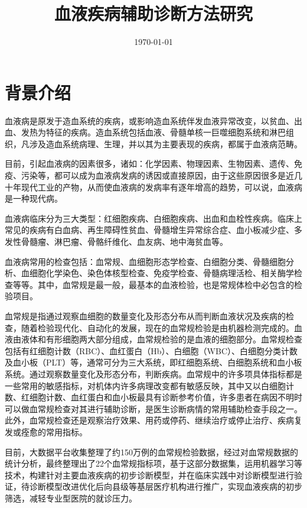 \documentclass[UTF8,a4paper,12pt, onecolumn]{ctexart}
\title{血液疾病辅助诊断方法研究}
\author{}
\date{\today}
\begin{document}
    \maketitle
    \thispagestyle{fancy}
    
\tableofcontents

\section{背景介绍}

血液病是原发于造血系统的疾病，或影响造血系统伴发血液异常改变，以贫血、出血、发热为特征的疾病。造血系统包括血液、骨髓单核一巨噬细胞系统和淋巴组织，凡涉及造血系统病理、生理，并以其为主要表现的疾病，都属于血液病范畴。

目前，引起血液病的因素很多，诸如：化学因素、物理因素、生物因素、遗传、免疫、污染等，都可以成为血液病发病的诱因或直接原因，由于这些原因很多是近几十年现代工业的产物，从而使血液病的发病率有逐年增高的趋势，可以说，血液病是一种现代病。

血液病临床分为三大类型：红细胞疾病、白细胞疾病、出血和血栓性疾病。临床上常见的疾病有白血病、再生障碍性贫血、骨髓增生异常综合症、血小板减少症、多发性骨髓瘤、淋巴瘤、骨骼纤维化、血友病、地中海贫血等。

血液病常用的检查包括：血常规、血细胞形态学检查、白细胞分类、骨髓细胞分析、血细胞化学染色、染色体核型检查、免疫学检查、骨髓病理活检、相关酶学检查等等。其中，血常规是最一般，最基本的血液检验，也是常规体检中必包含的检验项目。

血常规是指通过观察血细胞的数量变化及形态分布从而判断血液状况及疾病的检查，随着检验现代化、自动化的发展，现在的血常规检验是由机器检测完成的。血液由液体和有形细胞两大部分组成，血常规检验的是血液的细胞部分。血常规检查包括有红细胞计数（RBC）、血红蛋白（Hb）、白细胞（WBC）、白细胞分类计数及血小板（PLT）等，通常可分为三大系统，即红细胞系统、白细胞系统和血小板系统。通过观察数量变化及形态分布，判断疾病。血常规中的许多项具体指标都是一些常用的敏感指标，对机体内许多病理改变都有敏感反映，其中又以白细胞计数、红细胞计数、血红蛋白和血小板最具有诊断参考价值，许多患者在病因不明时可以做血常规检查对其进行辅助诊断，是医生诊断病情的常用辅助检查手段之一。此外，血常规检查还是观察治疗效果、用药或停药、继续治疗或停止治疗、疾病复发或痊愈的常用指标。

目前，大数据平台收集整理了约150万例的血常规检验数据，经过对血常规数据的统计分析，最终整理出了22个血常规指标项，基于这部分数据集，运用机器学习等技术，构建针对主要血液疾病的初步诊断模型，并在临床实践中对诊断模型进行验证，待诊断模型改进优化后向县级等基层医疗机构进行推广，实现血液疾病的初步筛选，减轻专业型医院的就诊压力。
\end{document}
